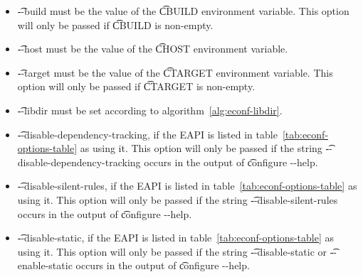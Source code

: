 \begin{description}
\begin{itemize}
    \item \t{-{}-build} must be the value of the \t{CBUILD} environment variable. This option will
        only be passed if \t{CBUILD} is non-empty.
    \item \t{-{}-host} must be the value of the \t{CHOST} environment variable.
    \item \t{-{}-target} must be the value of the \t{CTARGET} environment variable. This option will
        only be passed if \t{CTARGET} is non-empty.
    \item \t{-{}-libdir} must be set according to algorithm~\ref{alg:econf-libdir}.
    \item \t{-{}-disable-dependency-tracking}, if the EAPI is listed in
        table~\ref{tab:econf-options-table} as using it. This option will only be passed if the
        string \t{-{}-disable-dependency-tracking} occurs in the output of \t{configure -{}-help}.
    \item \t{-{}-disable-silent-rules}, if the EAPI is listed in table~\ref{tab:econf-options-table}
        as using it. This option will only be passed if the string \t{-{}-disable-silent-rules}
        occurs in the output of \t{configure -{}-help}.
    \item \t{-{}-disable-static}, if the EAPI is listed in table~\ref{tab:econf-options-table}
        as using it. This option will only be passed if the string \t{-{}-disable-static} or
        \t{-{}-enable-static} occurs in the output of \t{configure -{}-help}.
    \end{itemize}


\end{description}
